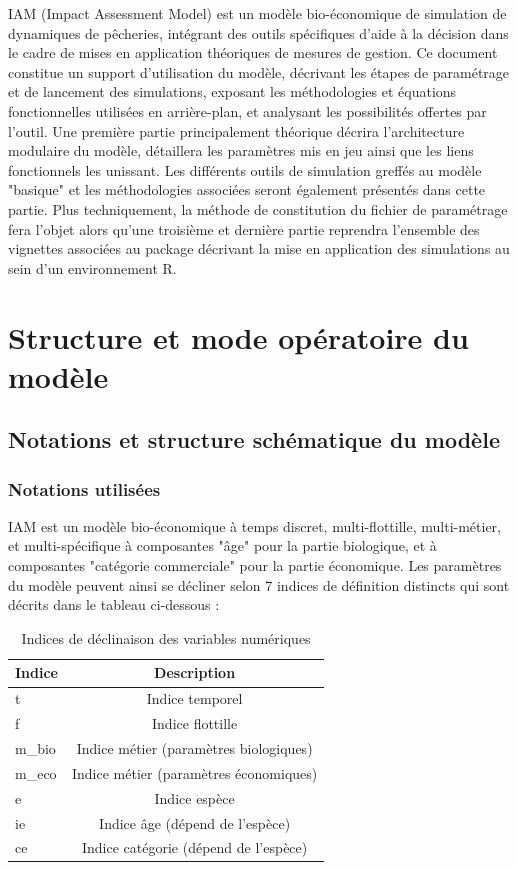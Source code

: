 \documentclass[12pt, colorinlistoftodos, notitlepage]{report}
\newenvironment{not used}[1]{%
    \longtable{%
        |>{\centering$\displaystyle}A{#1}{1}<{$}%
        |}\hline\ignorespaces}{%
    \endlongtable\ignorespacesafterend}
\begin{document}
IAM (Impact Assessment Model) est un modèle bio-économique de simulation de dynamiques de pêcheries, intégrant des outils spécifiques d'aide à la décision dans le cadre de mises en application théoriques de mesures de gestion. Ce document constitue un support d'utilisation du modèle, décrivant les étapes de paramétrage et de lancement des simulations, exposant les méthodologies et équations fonctionnelles utilisées en arrière-plan, et analysant les possibilités offertes par l'outil. Une première partie principalement théorique décrira l'architecture modulaire du modèle, détaillera les paramètres mis en jeu ainsi que les liens fonctionnels les unissant. Les différents outils de simulation greffés au modèle "basique" et les méthodologies associées seront également présentés dans cette partie. Plus techniquement, la méthode de constitution du fichier de paramétrage fera l'objet alors qu'une troisième et dernière partie reprendra l'ensemble des vignettes associées au package décrivant la mise en application des simulations au sein d'un environnement R.

\chapter{Structure et mode opératoire du modèle}

\section{Notations et structure schématique du modèle}

\subsection{Notations utilisées}

IAM est un modèle bio-économique à temps discret, multi-flottille, multi-métier, et multi-spécifique à composantes "âge" pour la partie biologique, et à composantes "catégorie commerciale" pour la partie économique. Les paramètres du modèle peuvent ainsi se décliner selon 7 indices de définition distincts qui sont décrits dans le tableau ci-dessous :

\begin{table}[h]
\centering
\begin{tabular}{|L| c |}
\hline
\textbf{Indice} & \textbf{Description} \\
 \hline
t & Indice temporel \\
f & Indice flottille \\
m_{bio} & Indice métier (paramètres biologiques) \\
m_{eco} & Indice métier (paramètres économiques) \\
e & Indice espèce \\
ie & Indice âge (dépend de l’espèce) \\
ce & Indice catégorie (dépend de l’espèce) \\
\hline
\end{tabular}
\label{neat}
\caption{Indices de déclinaison des variables numériques}
\end{table}
\end{document}
